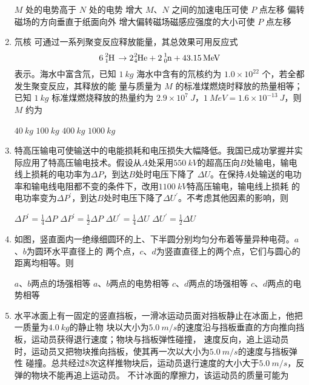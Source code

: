 \begin{enumerate}
\begin{figure}[h!]
\end{figure}


\fourchoices
{$ M $ 处的电势高于 $ N $ 处的电势}
{增大 $ M $、$ N $ 之间的加速电压可使 $ P $ 点左移}
{偏转磁场的方向垂直于纸面向外}
{增大偏转磁场磁感应强度的大小可使 $ P $ 点左移}



\item
氘核  可通过一系列聚变反应释放能量，其总效果可用反应式
\[ \ce{6^{2}_{1}H \rightarrow {2}_{4}^{2}He + 2^{1}_{0}n + 43.15MeV} \]
表示。海水中富含氘，已知 $ 1 \ kg $ 海水中含有的氘核约为 $ 1.0 \times 10^{22} $ 个，若全都发生聚变反应，其释放的能
量与质量为 $ M $ 的标准煤燃烧时释放的热量相等；已知 $ 1 \ kg $ 标准煤燃烧释放的热量约为 $ 2.9 \times 10^{7} \ J $，$ 1 \ MeV=1.6 \times 10^{-13} \ J $，则 $ M $ 约为  

\fourchoices
{$ 40 \ kg $}
{$ 100 \ kg $}
{$ 400 \ kg $}
{$ 1000 \ kg $}


\item
特高压输电可使输送中的电能损耗和电压损失大幅降低。我国已成功掌握并实际应用了特高压输电技术。假设从$ A $处采用$ 550 \ kV $的超高压向$ B $处输电，输电线上损耗的电功率为$ \Delta P $，到达$ B $处时电压下降了
$ \Delta U $。在保持$ A $处输送的电功率和输电线电阻都不变的条件下，改用$ 1100 \ kV $特高压输电，输电线上损耗
的电功率变为$ \Delta P ^{\prime} $，到达$ B $处时电压下降了$ \Delta U ^{\prime} $。不考虑其他因素的影响，则  

\fourchoices
{$\Delta P^{\prime}=\frac{1}{4} \Delta P$}
{$\Delta P^{\prime}=\frac{1}{2} \Delta P$}
{$\Delta U^{\prime}=\frac{1}{4} \Delta U$}
{$\Delta U^{\prime}=\frac{1}{2} \Delta U$}



\item
如图，竖直面内一绝缘细圆环的上、下半圆分别均匀分布着等量异种电荷。$ a $、$ b $为圆环水平直径上的
两个点，$ c $、$ d $为竖直直径上的两个点，它们与圆心的距离均相等。则  
\begin{figure}[h!]
\centering

\end{figure}


\fourchoices
{$ a $、$ b $两点的场强相等}
{$ a $、$ b $两点的电势相等}
{$ c $、$ d $两点的场强相等}
{$ c $、$ d $两点的电势相等}


\item
水平冰面上有一固定的竖直挡板，一滑冰运动员面对挡板静止在冰面上，他把一质量为$ 4.0 \ kg $的静止物
块以大小为$ 5.0 \ m/s $的速度沿与挡板垂直的方向推向挡板，运动员获得退行速度；物块与挡板弹性碰撞，
速度反向，追上运动员时，运动员又把物块推向挡板，使其再一次以大小为$ 5.0 \ m/s $的速度与挡板弹性
碰撞。总共经过$ 8 $次这样推物块后，运动员退行速度的大小大于$ 5.0 \ m/s $，反弹的物块不能再追上运动员。
不计冰面的摩擦力，该运动员的质量可能为  


\end{enumerate}
